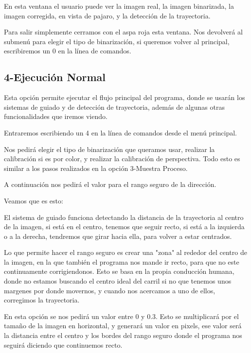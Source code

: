 En esta ventana el usuario puede ver la imagen real, la imagen binarizada, la imagen corregida, en vista de pajaro, y la detección de la trayectoria.

Para salir simplemente cerramos con el aspa roja esta ventana. Nos devolverá al submenú para elegir el tipo de binarización, si queremos volver al principal, escribiremos un 0 en la línea de comandos.

\subsection{4-Ejecución Normal}
Esta opción permite ejecutar el flujo principal del programa, donde se usarán los sistemas de guiado y de detección de trayectoria, además de algunas otras funcionalidades que iremos viendo.

Entraremos escribiendo un 4 en la línea de comandos desde el menú principal.

Nos pedirá elegir el tipo de binarización que queramos usar, realizar la calibración si es por color, y realizar la calibración de perspectiva. Todo esto es similar a los pasos realizados en la opción 3-Muestra Proceso.

A continuación nos pedirá el valor para el rango seguro de la dirección. 

Veamos que es esto:

El sistema de guiado funciona detectando la distancia de la trayectoria al centro de la imagen, si está en el centro, tenemos que seguir recto, si está a la izquierda o a la derecha, tendremos que girar hacia ella, para volver a estar centrados.

Lo que permite hacer el rango seguro es crear una "zona" al rededor del centro de la imagen, en la que también el programa nos mande ir recto, para que no este continuamente corrigiendonos. Esto se basa en la propia conducción humana, donde no estamos buscando el centro ideal del carril si no que tenemos unos margenes por donde movernos, y cuando nos acercamos a uno de ellos, corregimos la trayectoria.

En esta opción se nos pedirá un valor entre 0 y 0.3. Esto se multiplicará por el tamaño de la imagen en horizontal, y generará un valor en pixels, ese valor será la distancia entre el centro y los bordes del rango seguro donde el programa nos seguirá diciendo que continuemos recto.


